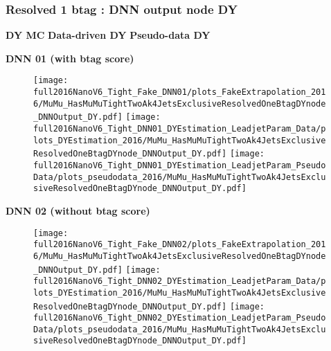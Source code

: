 \documentclass[9pt]{beamer}
\begin{document}
\begin{frame}
	\frametitle{Resolved 1 btag : DNN output node DY}
    \hspace{2cm} \textbf{DY MC} \hspace{1.9cm} \textbf{Data-driven DY} \hspace{1cm} \textbf{Pseudo-data DY}
    \begin{center}
        \textbf{DNN 01 (with btag score)}
    \end{center}
	\begin{figure}
		\texttt{[image: full2016NanoV6\_Tight\_Fake\_DNN01/plots\_FakeExtrapolation\_2016/MuMu\_HasMuMuTightTwoAk4JetsExclusiveResolvedOneBtagDYnode\_DNNOutput\_DY.pdf]}
		\texttt{[image: full2016NanoV6\_Tight\_DNN01\_DYEstimation\_LeadjetParam\_Data/plots\_DYEstimation\_2016/MuMu\_HasMuMuTightTwoAk4JetsExclusiveResolvedOneBtagDYnode\_DNNOutput\_DY.pdf]}
		\texttt{[image: full2016NanoV6\_Tight\_DNN01\_DYEstimation\_LeadjetParam\_PseudoData/plots\_pseudodata\_2016/MuMu\_HasMuMuTightTwoAk4JetsExclusiveResolvedOneBtagDYnode\_DNNOutput\_DY.pdf]}
	\end{figure}
    \begin{center}
        \textbf{DNN 02 (without btag score)}
    \end{center}
	\begin{figure}
		\texttt{[image: full2016NanoV6\_Tight\_Fake\_DNN02/plots\_FakeExtrapolation\_2016/MuMu\_HasMuMuTightTwoAk4JetsExclusiveResolvedOneBtagDYnode\_DNNOutput\_DY.pdf]}
		\texttt{[image: full2016NanoV6\_Tight\_DNN02\_DYEstimation\_LeadjetParam\_Data/plots\_DYEstimation\_2016/MuMu\_HasMuMuTightTwoAk4JetsExclusiveResolvedOneBtagDYnode\_DNNOutput\_DY.pdf]}
		\texttt{[image: full2016NanoV6\_Tight\_DNN02\_DYEstimation\_LeadjetParam\_PseudoData/plots\_pseudodata\_2016/MuMu\_HasMuMuTightTwoAk4JetsExclusiveResolvedOneBtagDYnode\_DNNOutput\_DY.pdf]}
	\end{figure}
\end{frame}
\end{document}
